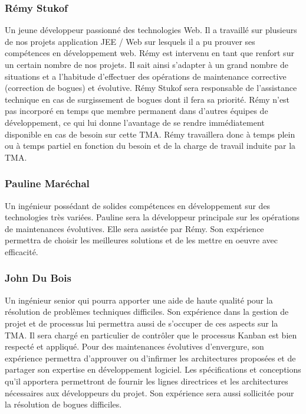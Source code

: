 \subsubsection{Rémy Stukof}
Un jeune développeur passionné des technologies Web. Il a travaillé sur plusieurs de nos projets application JEE / Web sur lesquels il a pu prouver ses compétences en développement web. Rémy est intervenu en tant que renfort sur un certain nombre de nos projets. Il sait ainsi s’adapter à un grand nombre de situations et a l’habitude d’effectuer des opérations de maintenance corrective (correction de bogues) et évolutive. Rémy Stukof sera responsable de l’assistance technique en cas de surgissement de bogues dont il fera sa priorité. Rémy n’est pas incorporé en temps que membre permanent dans d’autres équipes de développement, ce qui lui donne l’avantage de se rendre immédiatement disponible en cas de besoin sur cette TMA. Rémy travaillera donc à temps plein ou à temps partiel en fonction du besoin et de la charge de travail induite par la TMA. 

\subsubsection{Pauline Maréchal}
Un ingénieur possédant de solides compétences en développement sur des technologies très variées. Pauline sera la développeur principale sur les opérations de maintenances évolutives. Elle sera assistée par Rémy. Son expérience permettra de choisir les meilleures solutions et de les mettre en oeuvre avec efficacité. 

\subsubsection{John Du Bois}
Un ingénieur senior qui pourra apporter une aide de haute qualité pour la résolution de problèmes techniques difficiles. Son expérience dans la gestion de projet et de processus lui permettra aussi de s’occuper de ces aspects sur la TMA. Il sera chargé en particulier de contrôler que le processus Kanban est bien respecté et appliqué. Pour des maintenances évolutives d’envergure, son expérience permettra d’approuver ou d’infirmer les architectures proposées et de partager son expertise en développement logiciel. Les spécifications et conceptions qu’il apportera permettront de fournir les lignes directrices et les architectures nécessaires aux développeurs du projet. Son expérience sera aussi sollicitée pour la résolution de bogues difficiles. 


